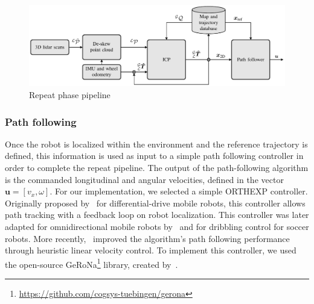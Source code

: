 \begin{figure} [htpb]
	\centering
	\includegraphics[width=.95\linewidth]{figs/Repeat_pipeline/repeat_pipeline.pdf}
	\caption{Repeat phase pipeline}
	\label{fig:repeat_pipeline}
\end{figure}

\subsubsection{Path following}
\label{sec:orthexp}


Once the robot is localized within the environment and the reference trajectory is defined, this information is used as input to a simple path following controller in order to complete the repeat pipeline.
The output of the path-following algorithm is the commanded longitudinal and angular velocities, defined in the vector $\bm u = [v_x, \omega]$.
For our implementation, we selected a simple \ac{ORTHEXP} controller.
Originally proposed by~\citet{Mojaev2004} for differential-drive mobile robots, this controller allows path tracking with a feedback loop on robot localization.
This controller was later adapted for omnidirectional mobile robots by~\citet{Li2007} and for dribbling control for soccer robots.
More recently,~\citet{Huskic2017} improved the algorithm's path following performance through heuristic linear velocity control.
To implement this controller, we used the open-source \ac{GeRoNa}\footnote{\url{https://github.com/cogsys-tuebingen/gerona}} library, created by~\citet{Huskic2019}.

